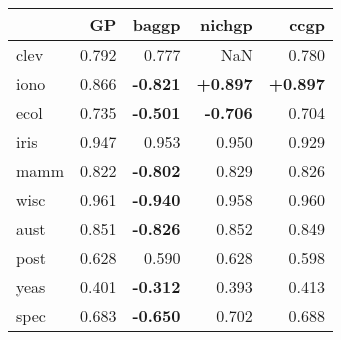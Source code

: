 \begin{tabular}{lrrrr}
\toprule
{} &     GP &  baggp &  nichgp &   ccgp \\
\midrule
clev & 0.792 & 0.777 & NaN & 0.780 \\
iono & 0.866 &    \textbf{-0.821} & \textbf{+0.897} & \textbf{+0.897} \\
ecol & 0.735 &    \textbf{-0.501} &    \textbf{-0.706} & 0.704 \\
iris & 0.947 & 0.953 & 0.950 & 0.929 \\
mamm & 0.822 &    \textbf{-0.802} & 0.829 & 0.826 \\
wisc & 0.961 &    \textbf{-0.940} & 0.958 & 0.960 \\
aust & 0.851 &    \textbf{-0.826} & 0.852 & 0.849 \\
post & 0.628 & 0.590 & 0.628 & 0.598 \\
yeas & 0.401 &    \textbf{-0.312} & 0.393 & 0.413 \\
spec & 0.683 &    \textbf{-0.650} & 0.702 & 0.688 \\
\bottomrule
\end{tabular}
